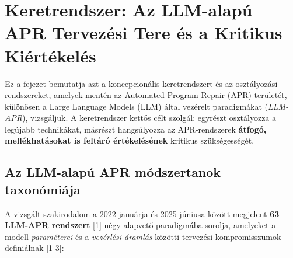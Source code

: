 \section{Keretrendszer: Az LLM-alapú APR Tervezési Tere és a Kritikus Kiértékelés}
\label{sec:framework}

Ez a fejezet bemutatja azt a koncepcionális keretrendszert és az osztályozási rendszereket, amelyek mentén az Automated Program Repair (APR) területét, különösen a Large Language Models (LLM) által vezérelt paradigmákat (\emph{LLM-APR}), vizsgáljuk. A keretrendszer kettős célt szolgál: egyrészt osztályozza a legújabb technikákat, másrészt hangsúlyozza az APR-rendszerek \textbf{átfogó, mellékhatásokat is feltáró értékelésének} kritikus szükségességét.

\subsection{Az LLM-alapú APR módszertanok taxonómiája}
\label{ssec:taxonomy}

A vizsgált szakirodalom a 2022 januárja és 2025 júniusa között megjelent \textbf{63 LLM-APR rendszert} [1] négy alapvető paradigmába sorolja, amelyeket a modell \emph{paraméterei} és a \emph{vezérlési áramlás} közötti tervezési kompromisszumok definiálnak [1-3]:

